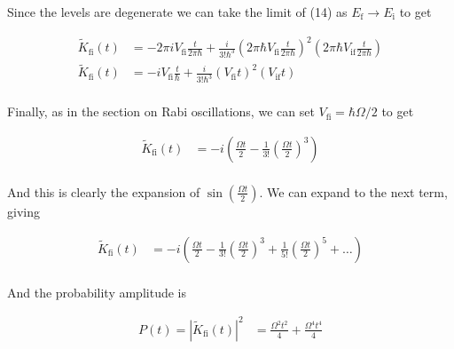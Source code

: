 \documentclass[]{article}
\begin{document}
\begin{enumerate}[1)]
Since the levels are degenerate we can take the limit of (14) as $E_\text{f} \to E_\text{i}$ to get

\begin{equation}
\begin{split}
\tilde{K}_\text{fi}(t) & = -2\pi i V_\text{fi} \frac{t}{2\pi \hbar} + \frac{i}{3! \hbar^3} \left( 2 \pi \hbar V_\text{fi}  \frac{t}{2\pi \hbar}  \right)^2 \left( 2 \pi \hbar V_\text{if}  \frac{t}{2\pi \hbar}  \right) \\
%
\tilde{K}_\text{fi}(t) & = -i V_\text{fi} \frac{t}{ \hbar} + \frac{i}{3! \hbar^3} \left( V_\text{fi} t  \right)^2 \left(  V_\text{if} t \right) \\
\end{split}
\end{equation}

Finally, as in the section on Rabi oscillations, we can set $V_\text{fi} = \hbar\Omega/2$ to get

\begin{equation}
\begin{split}
\tilde{K}_\text{fi}(t) & = -i \left( \frac{\Omega t}{2 } - \frac{1}{3!} \left( \frac{ \Omega t  }{2}\right)^3 \right)  \\
\end{split}
\end{equation}

And this is clearly the expansion of $\sin( \frac{\Omega t}{2 })$. We can expand to the next term, giving

\begin{equation}
\begin{split}
\tilde{K}_\text{fi}(t) & = -i \left( \frac{\Omega t}{2 } - \frac{1}{3!} \left( \frac{ \Omega t  }{2}\right)^3  + \frac{1}{5!}  \left( \frac{ \Omega t  }{2}\right)^5 + \dots\right)  \\
\end{split}
\end{equation}

And the probability amplitude is

\begin{equation}
\begin{split}
P(t) = |\tilde{K}_\text{fi}(t)|^2 & = \frac{ \Omega^2 t^2 }{4} +  \frac{ \Omega^4 t^4 }{4} \\
\end{split}
\end{equation}









\end{enumerate}
\end{document}
